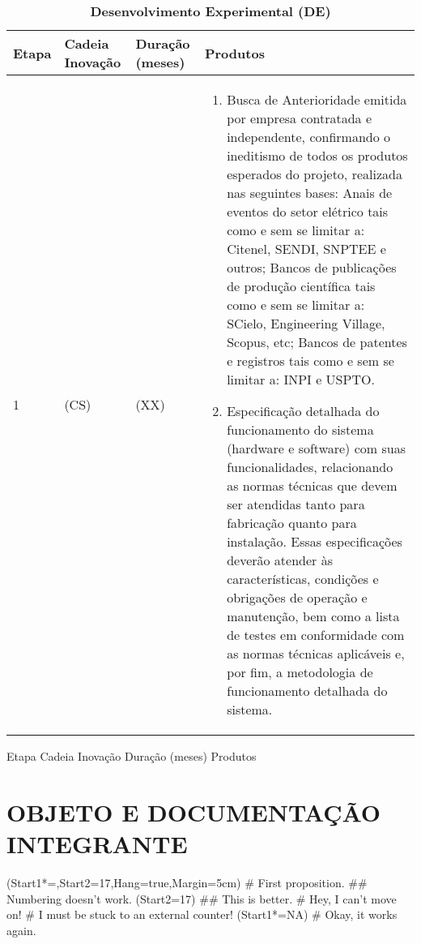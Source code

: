 \begin{easylist}
	
	\noindent
\begin{table}[ht]\caption{\textbf{Desenvolvimento Experimental (DE)}}%
\begin{tabular}{|p{10mm}|p{15mm}|p{15mm}|p{120mm}|}%
\hline %
Etapa & Cadeia Inovação & Duração (meses) & Produtos \\ %
\hline %
	1&(CS)&(XX)&
\begin{enumerate} 
	\item Busca de Anterioridade emitida por empresa contratada e independente, confirmando o ineditismo de todos os produtos esperados do projeto, realizada nas seguintes bases:  Anais de eventos do setor elétrico tais como e sem se limitar a: Citenel, SENDI, SNPTEE e outros; Bancos de publicações de produção científica tais como e sem se limitar a: SCielo, Engineering Village, Scopus, etc; Bancos de patentes e registros tais como e sem se limitar a: INPI e USPTO. 
	\item Especificação detalhada do funcionamento do sistema (hardware e software) com suas funcionalidades, relacionando as normas técnicas que devem ser atendidas tanto para fabricação quanto para instalação. Essas especificações deverão atender às características, condições e obrigações de operação e manutenção, bem como a lista de testes em conformidade com as normas técnicas aplicáveis e, por fim, a metodologia de funcionamento detalhada do sistema.
  \end{enumerate} \\

\hline %
\end{tabular}
\label{table:nonlin}%
\end{table}

  Etapa	Cadeia Inovação	Duração (meses)	Produtos


      \end{easylist}






\chapter{OBJETO E DOCUMENTAÇÃO INTEGRANTE}
    \begin{easylist}
        \ListProperties(Start1*=\thechapter,Start2=17,Hang=true,Margin=5cm)
        # First proposition.
        ## Numbering doesn't work.
        \ListProperties(Start2=17)
        ## This is better.
        # Hey, I can't move on!
        # I must be stuck to an external counter!
        \ListProperties(Start1*=NA)
        # Okay, it works again.
        \end{easylist}










